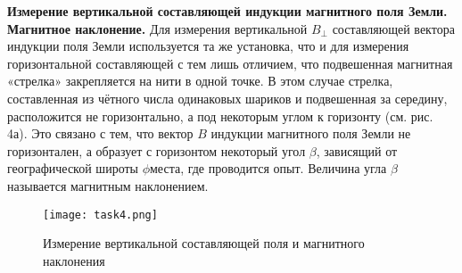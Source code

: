 \documentclass[12pt,a4paper]{article}
\begin{document}
\textbf{Измерение вертикальной составляющей индукции магнитного поля Земли. Магнитное наклонение.}
Для измерения вертикальной $B_{\perp}$ составляющей вектора индукции поля Земли используется та же установка, что и для измерения горизонтальной 
составляющей с тем лишь отличием, что подвешенная магнитная «стрелка» закрепляется на нити в одной точке. В этом случае 
стрелка, составленная из чётного числа одинаковых шариков и подвешенная за середину, расположится не горизонтально, а под некоторым
углом к горизонту (см. рис. 4а). Это связано с тем, что вектор $B$ индукции магнитного поля Земли не горизонтален, а образует с горизонтом 
некоторый угол $\beta$, зависящий от географической широты $\phi$места, где проводится опыт. Величина угла $\beta$ называется магнитным наклонением.
\begin{figure}[h!]
	\begin{center}
		\texttt{[image: task4.png]}
		\caption{Измерение вертикальной составляющей поля и магнитного наклонения}
		\label{fig:facility}
	\end{center}
\end{figure}
\end{document}

